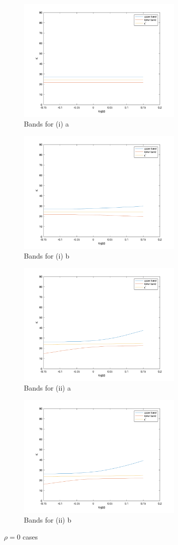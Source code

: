 \documentclass[10pt,letter]{article}
\begin{document}
\begin{center}
\begin{figure}
\begin{subfigure}{.5\textwidth}
\includegraphics[width=8cm]{ps3q2_fig5}
\caption{Bands for (i) a}
\end{subfigure}
\begin{subfigure}{.5\textwidth}
\includegraphics[width=8cm]{ps3q2_fig6}
\caption{Bands for (i) b}
\end{subfigure}
\begin{subfigure}{.5\textwidth}
\includegraphics[width=8cm]{ps3q2_fig7}
\caption{Bands for (ii) a}
\end{subfigure}
\begin{subfigure}{.5\textwidth}
\includegraphics[width=8cm]{ps3q2_fig8}
\caption{Bands for (ii) b}
\end{subfigure}
\caption{$\rho = 0$ cases}
\end{figure}
\end{center}
\end{document}
